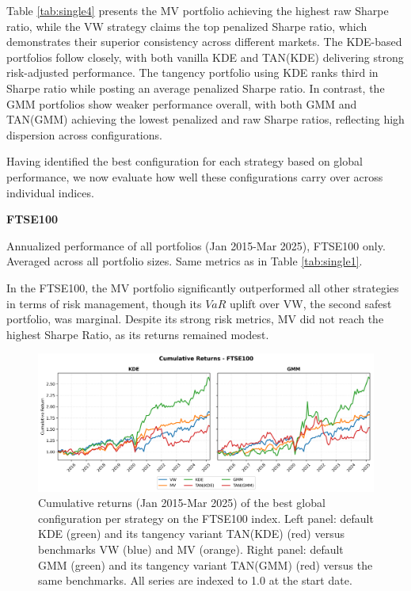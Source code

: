 Table \ref{tab:single4} presents the MV portfolio achieving the highest raw Sharpe ratio, while the VW strategy claims the top penalized Sharpe ratio, which demonstrates their superior consistency across different markets. The KDE-based portfolios follow closely, with both vanilla KDE and TAN(KDE) delivering strong risk-adjusted performance. The tangency portfolio using KDE ranks third in Sharpe ratio while posting an average penalized Sharpe ratio. In contrast, the GMM portfolios show weaker performance overall, with both GMM and TAN(GMM) achieving the lowest penalized and raw Sharpe ratios, reflecting high dispersion across configurations.

Having identified the best configuration for each strategy based on global performance, we now evaluate how well these configurations carry over across individual indices.

\begin{center}
  \textbf{FTSE100}
\end{center}
\begin{table}[H]
  \centering
  
  \caption[Global best configuration - All strategies - FTSE100]{Annualized performance of all portfolios (Jan 2015-Mar 2025), FTSE100 only. Averaged across all portfolio sizes. Same metrics as in Table \ref{tab:single1}.}
  \label{tab:single5}
\end{table}

In the FTSE100, the MV portfolio significantly outperformed all other strategies in terms of risk management, though its $VaR$ uplift over VW, the second safest portfolio, was marginal. Despite its strong risk metrics, MV did not reach the highest Sharpe Ratio, as its returns remained modest.

\vspace{5mm}
\begin{figure}[H]
  \begin{center}
  \begin{minipage}{1\textwidth}
    \centering
    \includegraphics[width=\textwidth]{images/40_6.png}
  \end{minipage}
  \caption[Global best configuration - FTSE100 - Cumulative returns]{Cumulative returns (Jan 2015-Mar 2025) of the best global configuration per strategy on the FTSE100 index. Left panel: default KDE (green) and its tangency variant TAN(KDE) (red) versus benchmarks VW (blue) and MV (orange). Right panel: default GMM (green) and its tangency variant TAN(GMM) (red) versus the same benchmarks. All series are indexed to 1.0 at the start date.}
  \label{fig:combined6}
  \end{center}
  \end{figure}

